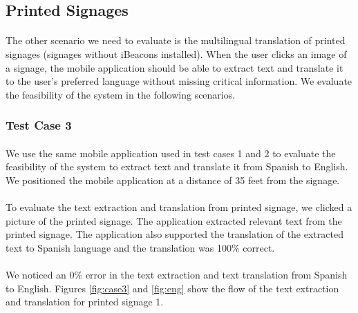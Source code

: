 \documentclass[12pt]{article}
\begin{document}
\subsection{Printed Signages }
\label{twoone}
\paragraph{}The other scenario we need to evaluate is the multilingual translation of printed signages (signages without iBeacons installed). When the user clicks an image of a signage, the mobile application should be able to extract text and translate it to the user's preferred language without missing critical information. We evaluate the feasibility of the system in the following scenarios.

\subsubsection{Test Case 3}
\label{threetwo}
\paragraph{}We use the same mobile application used in test cases 1 and 2 to evaluate the feasibility of the system to extract text and translate it from Spanish to English. We positioned the mobile application at a distance of 35 feet from the signage.

\paragraph{}To evaluate the text extraction and translation from printed signage, we clicked a picture of the printed signage. The application extracted relevant text from the printed signage. The application also supported the translation of the extracted text to Spanish language and the translation was 100\% correct.

\paragraph{}We noticed an 0\% error in the text extraction and text translation from Spanish to English. Figures  \ref{fig:case3} and \ref{fig:eng} show the flow of the text extraction and translation for printed signage 1.
\end{document}
